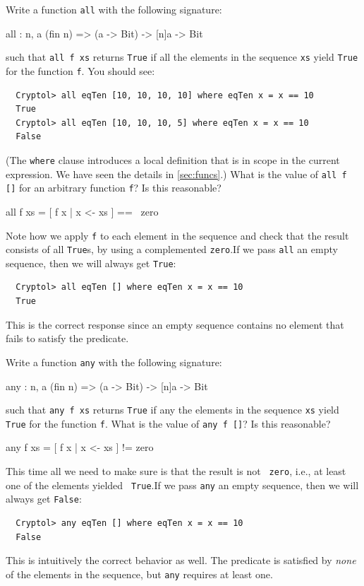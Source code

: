 \begin{Exercise}\label{ex:zero:1}
Write a function {\tt all} with the following signature:\indAll
\begin{code}
  all : {n, a} (fin n) => (a -> Bit) -> [n]a -> Bit
\end{code}
such that {\tt all f xs} returns {\tt True} if all the elements in the
sequence {\tt xs} yield {\tt True} for the function {\tt f}.
 You should see:
\begin{Verbatim}
  Cryptol> all eqTen [10, 10, 10, 10] where eqTen x = x == 10
  True
  Cryptol> all eqTen [10, 10, 10, 5] where eqTen x = x == 10
  False
\end{Verbatim}
(The {\tt where} clause introduces a local definition that is in scope
in the current expression. We have seen the details in
\autoref{sec:funcs}.\indWhere) What is the value of {\tt all f []}
for an arbitrary function {\tt f}? Is this reasonable?
\end{Exercise}
\begin{Answer}
\begin{code}
  all f xs = [ f x | x <- xs ] == ~zero
\end{code}
Note how we apply {\tt f} to each element in the sequence and check
that the result consists of all {\tt True}s, by using a complemented
{\tt zero}.\indZero\indAll If we pass {\tt all} an empty
sequence, then we will always get {\tt True}:
\begin{Verbatim}
  Cryptol> all eqTen [] where eqTen x = x == 10
  True
\end{Verbatim}
This is the correct response since an empty sequence contains no
element that fails to satisfy the predicate.
\end{Answer}

\begin{Exercise}\label{ex:zero:2}
Write a function {\tt any} with the following signature:\indAny
\begin{code}
  any : {n, a} (fin n) => (a -> Bit) -> [n]a -> Bit
\end{code}
such that {\tt any f xs} returns {\tt True} if any the elements in the
sequence {\tt xs} yield {\tt True} for the function {\tt f}. What is
the value of {\tt any f []}? Is this reasonable?
\end{Exercise}
\begin{Answer}
\begin{code}
  any f xs = [ f x | x <- xs ] != zero
\end{code}
This time all we need to make sure is that the result is not {\tt
  zero}, i.e., at least one of the elements yielded {\tt
  True}.\indZero\indTrue\indAny If we pass {\tt any} an empty sequence,
then we will always get {\tt False}:
\begin{Verbatim}
  Cryptol> any eqTen [] where eqTen x = x == 10
  False
\end{Verbatim}
This is intuitively the correct behavior as well. The predicate is
satisfied by {\em none} of the elements in the sequence, but {\tt any}
requires at least one.
\end{Answer}


